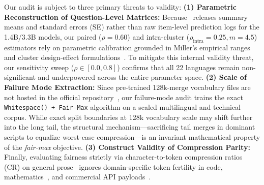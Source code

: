 Our audit is subject to three primary threats to validity:
\textbf{(1) Parametric Reconstruction of Question-Level Matrices:} Because~\cite{foroutan2026parity} releases summary means and standard errors (SE) rather than raw item-level prediction logs for the 1.4B/3.3B models, our paired ($\rho=0.60$) and intra-cluster ($\rho_{\mathrm{intra}}=0.25, m=4.5$) estimators rely on parametric calibration grounded in Miller's empirical ranges~\cite{miller2024adding} and cluster design-effect formulations~\cite{abadie2022when}. To mitigate this internal validity threat, our sensitivity sweep ($\rho \in [0.0, 0.8]$) confirms that all 22 languages remain non-significant and underpowered across the entire parameter space.
\textbf{(2) Scale of Failure Mode Extraction:} Since pre-trained 128k-merge vocabulary files are not hosted in the official repository~\cite{foroutan2026parity}, our failure-mode audit trains the exact \texttt{Whitespace() + Fair-Max} algorithm on a scaled multilingual and technical corpus. While exact split boundaries at 128k vocabulary scale may shift further into the long tail, the structural mechanism---sacrificing tail merges in dominant scripts to equalize worst-case compression---is an invariant mathematical property of the \textit{fair-max} objective.
\textbf{(3) Construct Validity of Compression Parity:} Finally, evaluating fairness strictly via character-to-token compression ratios (CR) on general prose~\cite{nllb2022no,foroutan2026parity} ignores domain-specific token fertility in code, mathematics~\cite{singh2024tokenization}, and commercial API payloads~\cite{petrov2023language,ahia2023all}.



